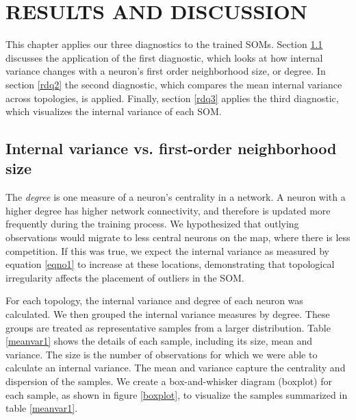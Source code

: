 \chapter{RESULTS AND DISCUSSION}
This chapter applies our three diagnostics to the trained SOMs.  Section
\ref{rdq1} discusses the application of the first diagnostic, which looks at how internal variance
changes with a neuron's first order neighborhood size, or degree.  In section
\ref{rdq2} the second diagnostic, which compares the mean
internal variance across topologies, is applied.  Finally, section \ref{rdq3} applies the
third diagnostic, which visualizes the internal variance of each SOM.


\section{Internal variance vs. first-order neighborhood size}
\label{rdq1}
The \emph{degree} is one measure of a neuron's centrality in a network. A
neuron with a higher degree has higher network connectivity, and therefore is
updated more frequently during the training process.  We hypothesized that
outlying observations would migrate to less central neurons on the map, where
there is less competition.  If this was true, we expect the internal variance
as measured by equation \ref{eqno1} to increase at these locations,
demonstrating that topological irregularity affects the placement of outliers
in the SOM.  

For each topology, the internal variance and degree of each neuron was
calculated. We then grouped the internal variance measures by degree.  These groups are
treated as representative samples from a larger distribution. Table \ref{meanvar1}
shows the details of each sample, including its size, mean and variance. 
The size is the number of observations for which we were able to calculate an
internal variance. The mean and variance capture the centrality and
dispersion of the samples.  We create a box-and-whisker diagram (boxplot) for
each sample, as shown in figure \ref{boxplot}, to visualize the samples
summarized in table \ref{meanvar1}.


